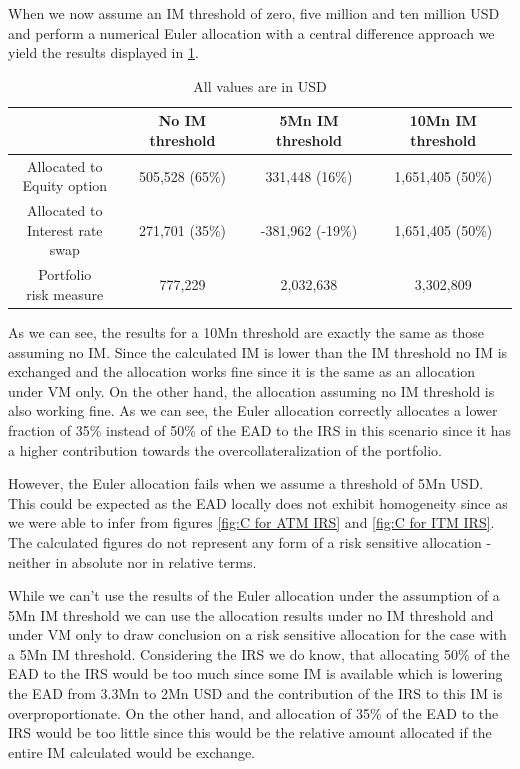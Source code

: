 \documentclass[../Thesis_AHoecherl.tex]{subfiles}
\begin{document}
    When we now assume an \gls{IM} threshold of zero, five million and ten million USD and perform a numerical Euler allocation with a central difference approach we yield the results displayed in \ref{tab:IM threshold example allocated}.
    \begin{table}[htbp]
        \centering
        \begin{tabular}{c||c|c|c}
            & No \gls{IM} threshold & 5Mn \gls{IM} threshold & 10Mn \gls{IM} threshold \\
            \toprule
            \makecell{Allocated to \\ Equity option} & 505,528 (65\%) & 331,448 (16\%) & 1,651,405 (50\%) \\
            \midrule
            \makecell{Allocated to \\ Interest rate swap}& 271,701 (35\%) & -381,962 (-19\%) & 1,651,405 (50\%) \\
            \bottomrule
            \makecell{Portfolio \\ risk measure} & 777,229 & 2,032,638 & 3,302,809 \\
        \end{tabular}%
        \caption{All values are in USD}
        \label{tab:IM threshold example allocated}
    \end{table}
    As we can see, the results for a 10Mn threshold are exactly the same as those assuming no IM. Since the calculated \gls{IM} is lower than the \gls{IM} threshold no \gls{IM} is exchanged and the allocation works fine since it is the same as an allocation under \gls{VM} only.
    On the other hand, the allocation assuming no \gls{IM} threshold is also working fine. As we can see, the Euler allocation correctly allocates a lower fraction of 35\% instead of 50\% of the \gls{EAD} to the \gls{IRS} in this scenario since it has a higher contribution towards the overcollateralization of the portfolio.

    However, the Euler allocation fails when we assume a threshold of 5Mn USD. This could be expected as the \gls{EAD} locally does not exhibit homogeneity since as we were able to infer from figures \ref{fig:C for ATM IRS} and \ref{fig:C for ITM IRS}. The calculated figures do not represent any form of a risk sensitive allocation - neither in absolute nor in relative terms.

    While we can't use the results of the Euler allocation under the assumption of a 5Mn \gls{IM} threshold we can use the allocation results under no \gls{IM} threshold and under \gls{VM} only to draw conclusion on a risk sensitive allocation for the case with a 5Mn \gls{IM} threshold.
    Considering the \gls{IRS} we do know, that allocating 50\% of the \gls{EAD} to the \gls{IRS} would be too much since some \gls{IM} is available which is lowering the \gls{EAD} from 3.3Mn to 2Mn USD and the contribution of the \gls{IRS} to this \gls{IM} is overproportionate. On the other hand, and allocation of 35\% of the \gls{EAD} to the \gls{IRS} would be too little since this would be the relative amount allocated if the entire \gls{IM} calculated would be exchange.
    
\end{document}
